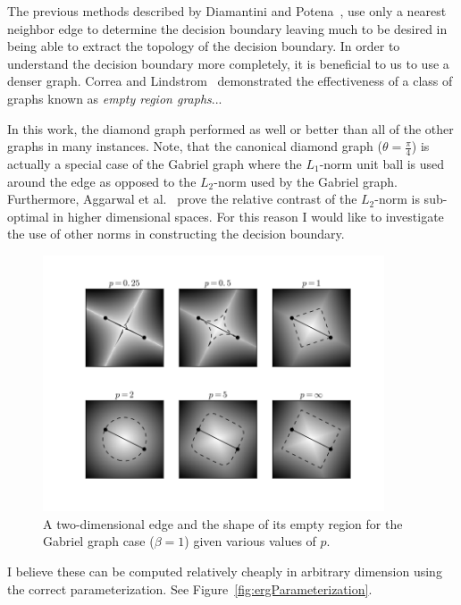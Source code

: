 \documentclass[12pt]{article}
\begin{document}
The previous methods described by Diamantini and
Potena~\cite{DiamantiniPotena2007}, use only a nearest neighbor edge to
determine the decision boundary leaving much to be desired in being able to
extract the topology of the decision boundary.
%
In order to understand the decision boundary more completely, it is beneficial
to us to use a denser graph.
%
Correa and Lindstrom~\cite{CorreaLindstrom2011} demonstrated the effectiveness
of a class of graphs known as \emph{empty region graphs}...

In this work, the diamond graph performed as well or better than all of the
other graphs in many instances.
%
Note, that the canonical diamond graph ($\theta=\frac{\pi}{4}$) is actually a
special case of the Gabriel graph where the $L_1$-norm unit ball is used around
the edge as opposed to the $L_2$-norm used by the Gabriel graph.
%
Furthermore, Aggarwal et al.~\cite{AggarwalHinneburgKeim2001} prove the relative
contrast of the $L_2$-norm is sub-optimal in higher dimensional spaces.
%
For this reason I would like to investigate the use of other norms in
constructing the decision boundary.

\begin{figure}[!ht]
  \centering
  \includegraphics[width=0.9\textwidth]{figs/chap6/emptyRegions}
  \caption[Gabriel graph empty regions using various $L_p$-norms]{A
  two-dimensional edge and the shape of its empty region for the Gabriel graph
  case ($\beta=1$) given various values of $p$.}
  \label{fig:ergs}
\end{figure}

I believe these can be computed relatively cheaply in arbitrary dimension using
the correct parameterization. See Figure~\ref{fig:ergParameterization}.
\end{document}
